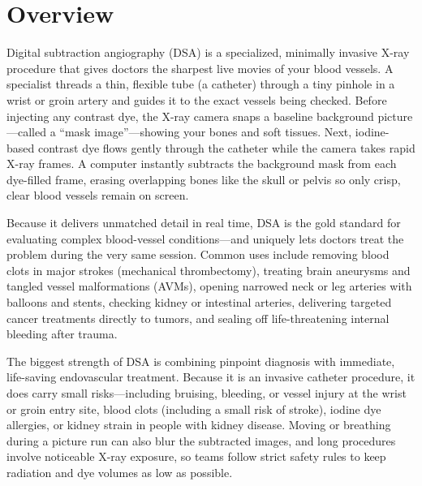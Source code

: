 \label{ch:infographic-dsa}

\section{Overview}

Digital subtraction angiography (DSA) is a specialized, minimally invasive X-ray procedure that gives doctors the sharpest live movies of your blood vessels. A specialist threads a thin, flexible tube (a catheter) through a tiny pinhole in a wrist or groin artery and guides it to the exact vessels being checked. Before injecting any contrast dye, the X-ray camera snaps a baseline background picture---called a ``mask image''---showing your bones and soft tissues. Next, iodine-based contrast dye flows gently through the catheter while the camera takes rapid X-ray frames. A computer instantly subtracts the background mask from each dye-filled frame, erasing overlapping bones like the skull or pelvis so only crisp, clear blood vessels remain on screen.

Because it delivers unmatched detail in real time, DSA is the gold standard for evaluating complex blood-vessel conditions---and uniquely lets doctors treat the problem during the very same session. Common uses include removing blood clots in major strokes (mechanical thrombectomy), treating brain aneurysms and tangled vessel malformations (AVMs), opening narrowed neck or leg arteries with balloons and stents, checking kidney or intestinal arteries, delivering targeted cancer treatments directly to tumors, and sealing off life-threatening internal bleeding after trauma.

The biggest strength of DSA is combining pinpoint diagnosis with immediate, life-saving endovascular treatment. Because it is an invasive catheter procedure, it does carry small risks---including bruising, bleeding, or vessel injury at the wrist or groin entry site, blood clots (including a small risk of stroke), iodine dye allergies, or kidney strain in people with kidney disease. Moving or breathing during a picture run can also blur the subtracted images, and long procedures involve noticeable X-ray exposure, so teams follow strict safety rules to keep radiation and dye volumes as low as possible.

